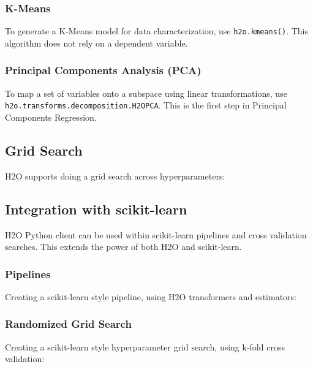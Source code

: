 

\subsubsection{K-Means}
To generate a K-Means model for data characterization, use
{\texttt{h2o.kmeans()}}. This algorithm does not rely on a
dependent variable.



\subsubsection{Principal Components Analysis (PCA)}
To map a set of variables onto a subspace using linear
transformations, use {\texttt{h2o.transforms.decomposition.H2OPCA}}.
This is the first step in Principal Components Regression.


\subsection{Grid Search}
H2O supports doing a grid search across hyperparameters:


\subsection{Integration with scikit-learn}
H2O Python client can be used within scikit-learn pipelines and cross validation searches.  This extends
 the power of both H2O and scikit-learn.
\subsubsection{Pipelines}

Creating a scikit-learn style pipeline, using H2O transformers and estimators:


\subsubsection{Randomized Grid Search}
Creating a scikit-learn style hyperparameter grid search, using k-fold cross validation:




